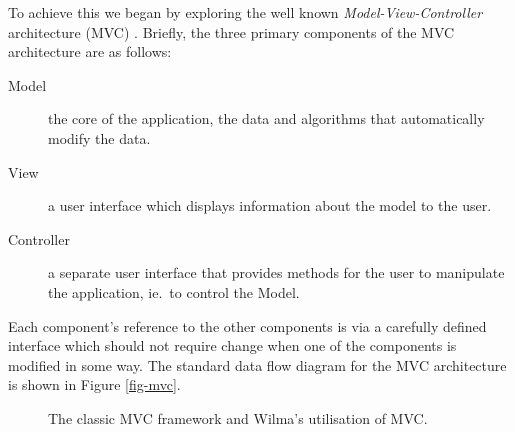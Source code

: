 \documentclass[runningheads]{cl2emult}
\begin{document}
To achieve this we began by exploring the well known {\em
Model-View-Controller} architecture (MVC) \cite{gamma94design}.
Briefly, the three primary components of the MVC architecture are as
follows: 

\begin{description}
\item[Model] the core
of the application, the data and algorithms that automatically modify
the data. 
\item[View] a user interface which displays information
about the model to the user. 
\item[Controller] a separate user
interface that provides methods for the user to manipulate the
application, ie.\ to control the Model.  
\end{description}

Each component's reference to
the other components is via a carefully defined interface which should
not require change when one of the components is modified in some way.  The
standard data flow diagram for the MVC architecture is shown in Figure
\ref{fig-mvc}.

\begin{figure}[h]
  \centering
  \caption{The classic MVC framework and Wilma's utilisation of MVC.}
\end{figure}
\end{document}
